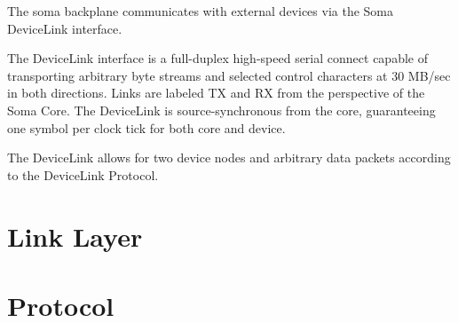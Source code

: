
The soma backplane communicates with external devices via the Soma
DeviceLink interface.

The DeviceLink interface is a full-duplex high-speed serial connect
capable of transporting arbitrary byte streams and selected control
characters at 30 MB/sec in both directions. Links are labeled TX and
RX from the perspective of the Soma Core. The DeviceLink is
source-synchronous from the core, guaranteeing one symbol per clock
tick for both core and device.

The DeviceLink allows for two device nodes and arbitrary data packets
according to the DeviceLink Protocol.

\section {Link Layer}



\section {Protocol}




